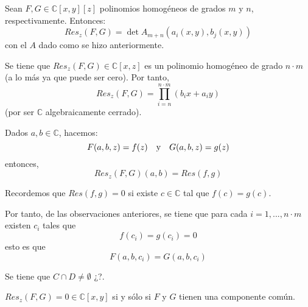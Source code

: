 \documentclass[12pt]{report}
\theoremstyle{largebreak}
\begin{document}
    \begin{mydef}
        Sean $F,G\in\mathbb{C}[x,y][z]$ polinomios homogéneos de grados $m$ y $n$, respectivamente. Entonces:
        \begin{equation*}
            Res_{z}(F,G)=\det A_{ m+n}(a_i(x,y),b_j(x,y))
        \end{equation*}
        con el $A$ dado como se hizo anteriormente.
    \end{mydef}

    \begin{obs}
        Se tiene que $Res_{z}(F,G)\in\mathbb{C}[x,z]$ es un polinomio homogéneo de grado $n\cdot m$ (a lo más ya que puede ser cero). Por tanto,
        \begin{equation*}
            Res_z(F,G)=\prod_{ i=n}^{ n\cdot m}(b_ix+a_iy)
        \end{equation*}
        (por ser $\mathbb{C}$ algebraicamente cerrado).
    \end{obs}

    \begin{obs}
        Dados $a,b\in\mathbb{C}$, hacemos:
        \begin{equation*}
            F(a,b,z)=f(z)\quad\textup{y}\quad G(a,b,z)=g(z)
        \end{equation*}
        entonces,
        \begin{equation*}
            Res_z(F,G)(a,b)=Res(f,g)
        \end{equation*}
        
        Recordemos que $Res(f,g)=0$ si existe $c\in\mathbb{C}$ tal que $f(c)=g(c)$.
    \end{obs}

    Por tanto, de las observaciones anteriores, se tiene que para cada $i=1,...,n\cdot m$ existen $c_i$ tales que
    \begin{equation*}
        f(c_i)=g(c_i)=0
    \end{equation*}
    esto es que
    \begin{equation*}
        F(a,b,c_i)=G(a,b,c_i)
    \end{equation*}

    \begin{obs}
        Se tiene que $C\cap D\neq\emptyset$ ¿?.
    \end{obs}

    \begin{propo}
        $Res_z(F,G)=0\in\mathbb{C}[x,y]$ si y sólo si $F$ y $G$ tienen una componente común.
    \end{propo}
\end{document}
